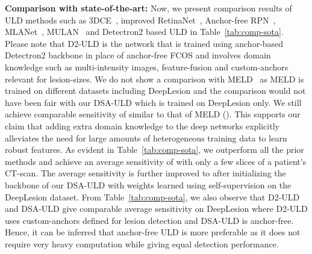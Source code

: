 \documentclass{article}
\begin{document}
\noindent \textbf{Comparison with state-of-the-art:} Now, we present comparison results of ULD methods such as 3DCE~\cite{3dce}, improved RetinaNet~\cite{retinanet_improv}, Anchor-free RPN~\cite{anchorfree-rpn}, MLANet~\cite{mla-net}, MULAN~\cite{yan2019mulan} and Detectron2 based ULD in Table~\ref{tab:comp-sota}. Please note that D2-ULD is the network that is trained using anchor-based Detectron2 backbone in place of anchor-free FCOS and involves domain knowledge such as multi-intensity images, feature-fusion and custom-anchors relevant for lesion-sizes. We do not show a comparison with MELD~\cite{meld} as MELD is trained on  different datasets including DeepLesion and the comparison would not have been fair with our DSA-ULD which is trained on DeepLesion only. We still achieve comparable sensitivity of  similar to that of MELD (). This supports our claim that adding extra domain knowledge to the deep networks explicitly alleviates the need for large amounts of heterogeneous training data to learn robust features. As evident in Table~\ref{tab:comp-sota}, we outperform all the prior methods and achieve an average sensitivity of  with only a few slices of a patient's CT-scan. The average sensitivity is further improved to  after initializing the backbone of our DSA-ULD with weights learned using self-supervision on the DeepLesion dataset. From Table~\ref{tab:comp-sota}, we also observe that D2-ULD and DSA-ULD give comparable average sensitivity on DeepLesion where D2-ULD uses custom-anchors defined for lesion detection and DSA-ULD is anchor-free. Hence, it can be inferred that anchor-free ULD is more preferable as it does not require very heavy computation while giving equal detection performance.
\end{document}
